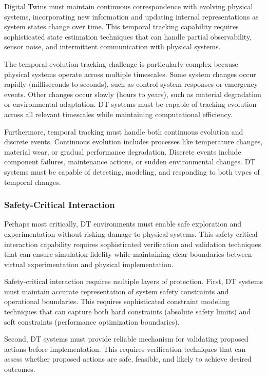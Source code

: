 Digital Twins must maintain continuous correspondence with evolving physical systems, incorporating new information and updating internal representations as system states change over time. This temporal tracking capability requires sophisticated state estimation techniques that can handle partial observability, sensor noise, and intermittent communication with physical systems.

The temporal evolution tracking challenge is particularly complex because physical systems operate across multiple timescales. Some system changes occur rapidly (milliseconds to seconds), such as control system responses or emergency events. Other changes occur slowly (hours to years), such as material degradation or environmental adaptation. DT systems must be capable of tracking evolution across all relevant timescales while maintaining computational efficiency.

Furthermore, temporal tracking must handle both continuous evolution and discrete events. Continuous evolution includes processes like temperature changes, material wear, or gradual performance degradation. Discrete events include component failures, maintenance actions, or sudden environmental changes. DT systems must be capable of detecting, modeling, and responding to both types of temporal changes.

\subsubsection{Safety-Critical Interaction}

Perhaps most critically, DT environments must enable safe exploration and experimentation without risking damage to physical systems. This safety-critical interaction capability requires sophisticated verification and validation techniques that can ensure simulation fidelity while maintaining clear boundaries between virtual experimentation and physical implementation.

Safety-critical interaction requires multiple layers of protection. First, DT systems must maintain accurate representation of system safety constraints and operational boundaries. This requires sophisticated constraint modeling techniques that can capture both hard constraints (absolute safety limits) and soft constraints (performance optimization boundaries).

Second, DT systems must provide reliable mechanism for validating proposed actions before implementation. This requires verification techniques that can assess whether proposed actions are safe, feasible, and likely to achieve desired outcomes.

